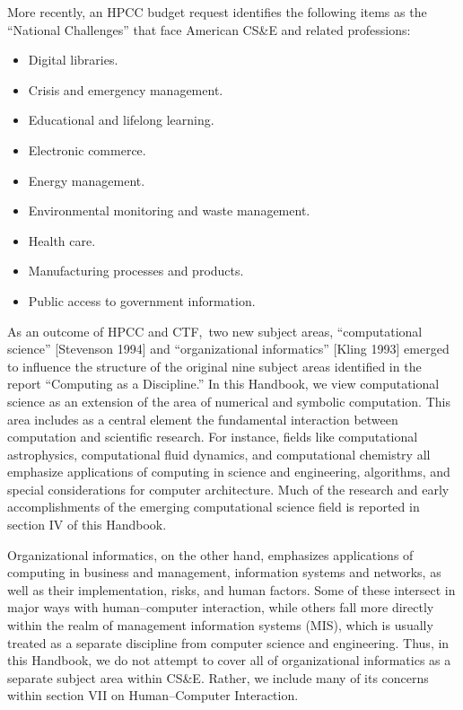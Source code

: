 More recently, an HPCC budget request identifies the following
items as the ``National Challenges'' that face American CS\&E and
related professions:

\begin{itemize}
\item
 Digital libraries.
\item
 Crisis and emergency management.
\item
 Educational and lifelong learning.
\item
 Electronic commerce.
\item
 Energy management.
\item
 Environmental monitoring and waste management.
\item
 Health care.
\item
 Manufacturing processes and products.
\item
 Public access to government information.
\end{itemize}

As an outcome of HPCC and CTF,\, two new subject areas,
``computational science'' [Stevenson 1994] and ``organizational
informatics'' [Kling 1993] emerged to influence the structure of
the original nine subject areas identified in the report
``Computing as a Discipline.'' In this Handbook, we view
computational science as an extension of the area of numerical
and symbolic computation. This area includes as a central
element the fundamental interaction between computation and
scientific research. For instance, fields like computational
astrophysics, computational fluid dynamics, and computational
chemistry all emphasize applications of computing in science and
engineering, algorithms, and special considerations for computer
architecture. Much of the research and early accomplishments of
the emerging computational science field is reported in section IV of
this Handbook.

Organizational informatics, on the other hand, emphasizes
applications of computing in business and management,
information systems and networks, as well as their
implementation, risks, and human factors. Some of these
intersect in major ways with human--computer interaction, while
others fall more directly within the realm of management
information systems (MIS), which is usually treated as a
separate discipline from computer science and engineering. Thus,
in this Handbook, we do not attempt to cover all of
organizational informatics as a separate subject area within
CS\&E. Rather, we include many of its concerns within section VII on
Human--Computer Interaction.

